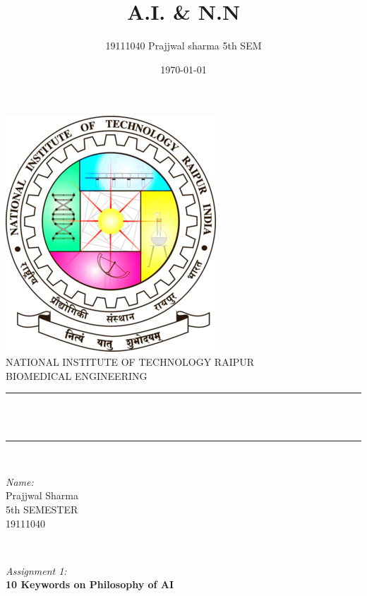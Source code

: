 \documentclass[12pt]{article}
\title{A.I. \&  N.N}								%
\author{19111040 Prajjwal sharma 5th SEM}								%
\date{\today}											%
\makeatletter
\let\thetitle\@title
\makeatother
\begin{document}

\begin{titlepage}
	\centering
    \vspace*{0.5 cm}
    \includegraphics[scale = 0.5]{logo.png}\\[1.0 cm]	%
    \textsc{\Large \newline NATIONAL INSTITUTE OF TECHNOLOGY RAIPUR}\\[2.0 cm]	%
	\textsc{\Large BIOMEDICAL ENGINEERING}\\[0.5 cm]				%
	\rule{\linewidth}{0.2 mm} \\[0.4 cm]
	{ \huge \bfseries \thetitle}\\
	\rule{\linewidth}{0.2 mm} \\[1.5 cm]
	
	\begin{minipage}{0.5\textwidth}
		\begin{flushleft} \large
			\emph{Name:}\\
			Prajjwal Sharma\\
            5th SEMESTER\\
            19111040\\
			\end{flushleft}
			\end{minipage}~
			\begin{minipage}{0.4\textwidth}
            
			\begin{flushright} \large
			\emph{Assignment 1:} \\
				\bf{10 Keywords on Philosophy of AI}
		\end{flushright}
        
	\end{minipage}\\[2 cm]
	
	

    
    
    
	
\end{titlepage}
\end{document}
